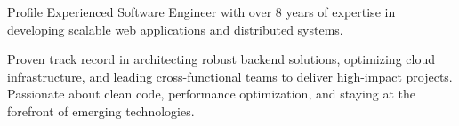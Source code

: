 \begin{rubric}{Profile}
\entry*[]
Experienced Software Engineer with over 8 years of expertise in developing scalable web applications and distributed systems.

\entry*[]
Proven track record in architecting robust backend solutions, optimizing cloud infrastructure, and leading cross-functional teams to deliver high-impact projects.
\entry*[]
Passionate about clean code, performance optimization, and staying at the forefront of emerging technologies.
\end{rubric}
